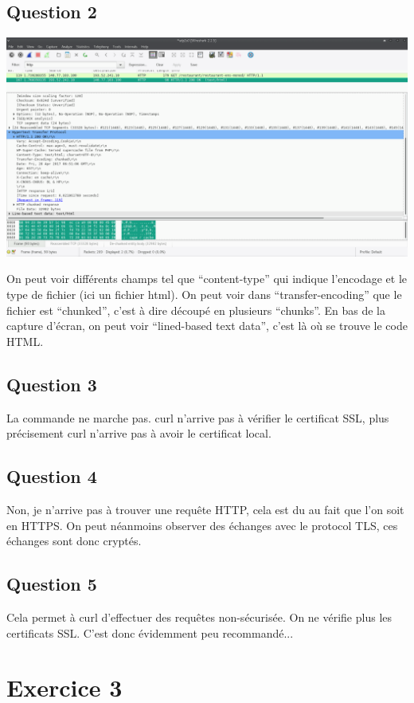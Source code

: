 \documentclass[10,a4paper]{article}
\begin{document}
\subsection*{Question 2}
\begin{center}
  \includegraphics[width=15cm]{exo2_2.png}
\end{center}
On peut voir différents champs tel que ``content-type'' qui indique l'encodage et le type de fichier (ici un fichier html). On peut voir dans ``transfer-encoding'' que le fichier est ``chunked'', c'est à dire découpé en plusieurs ``chunks''. En bas de la capture d'écran, on peut voir ``lined-based text data'', c'est là où se trouve le code HTML.

\subsection*{Question 3}
La commande ne marche pas. curl n'arrive pas à vérifier le certificat SSL, plus précisement curl n'arrive pas à avoir le certificat local.

\subsection*{Question 4}
Non, je n'arrive pas à trouver une requête HTTP, cela est du au fait que l'on soit en HTTPS. On peut néanmoins observer des échanges avec le protocol TLS, ces échanges sont donc cryptés.

\subsection*{Question 5}
Cela permet à curl d'effectuer des requêtes non-sécurisée. On ne vérifie plus les certificats SSL. C'est donc évidemment peu recommandé...

\section*{Exercice 3}
\end{document}
